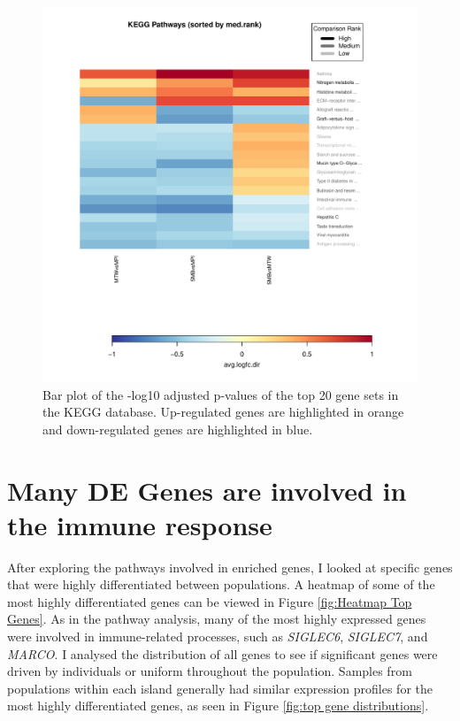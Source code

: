 \documentclass[12pt,a4paper,titlepage,twoside,openright]{book}
\begin{document}
\begin{mainmatter}
{{\begin{figure}[htb!]
\centering
\includegraphics[width=\textwidth,height=\textheight,keepaspectratio]{Figures/summary_heatmaps_kegg.pdf}
\caption{Bar plot of the -log10 adjusted p-values of the top 20 gene sets in the KEGG database. Up-regulated genes are highlighted in orange and down-regulated genes are highlighted in blue.}
\label{fig:Kegg Heatmap}
\end{figure}


\section{Many DE Genes are involved in the immune response} 

After exploring the pathways involved in enriched genes, I looked at specific genes that were highly differentiated between populations. A heatmap of some of the most highly differentiated genes can be viewed in Figure \ref{fig:Heatmap Top Genes}. As in the pathway analysis, many of the most highly expressed genes were involved in immune-related processes, such as \textit{SIGLEC6}, \textit{SIGLEC7}, and \textit{MARCO}. I analysed the distribution of all genes to see if significant genes were driven by individuals or uniform throughout the population. Samples from populations within each island generally had similar expression profiles for the most highly differentiated genes, as seen in Figure \ref{fig:top gene distributions}.

}}
\end{mainmatter}
\end{document}
